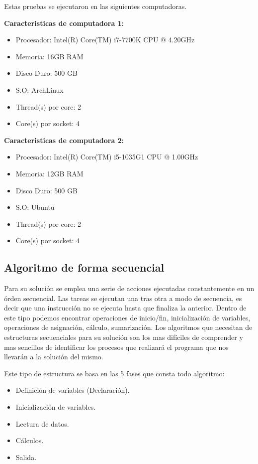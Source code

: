 \documentclass[10pt]{IEEEtran}
\begin{document}
Estas pruebas se ejecutaron en las siguientes computadoras.

\textbf{Caracteristicas de computadora 1:}
\begin{itemize}
  \item Procesador: Intel(R) Core(TM) i7-7700K CPU @ 4.20GHz
  \item Memoria: 16GB RAM
  \item Disco Duro: 500 GB
  \item S.O: ArchLinux
  \item Thread(s) por core: 2
  \item Core(s) por socket: 4
\end{itemize}

\textbf{Caracteristicas de computadora 2:}
\begin{itemize}
  \item Procesador: Intel(R) Core(TM) i5-1035G1 CPU @ 1.00GHz
  \item Memoria: 12GB RAM
  \item Disco Duro: 500 GB
  \item S.O:  Ubuntu
  \item Thread(s) por core: 2
  \item Core(s) por socket: 4
\end{itemize}

\subsection{Algoritmo de forma secuencial}

Para su solución se emplea una serie de acciones ejecutadas constantemente en un órden secuencial. Las tareas se ejecutan una tras otra a modo de secuencia, es decir que una instrucción no se ejecuta hasta que finaliza la anterior. Dentro de este tipo podemos encontrar operaciones de inicio/fin, inicialización de variables, operaciones de asignación, cálculo, sumarización. Los algoritmos que necesitan de estructuras secuenciales para su solución son los mas difíciles de comprender y mas sencillos de identificar los procesos que realizará el programa que nos llevarán a la solución del mismo.

Este tipo de estructura se basa en las 5 fases que consta todo algoritmo:

\begin{itemize}
  \item Definición de variables (Declaración).
  \item Inicialización de variables.
  \item Lectura de datos.
  \item Cálculos.
  \item Salida.
\end{itemize}
\end{document}
